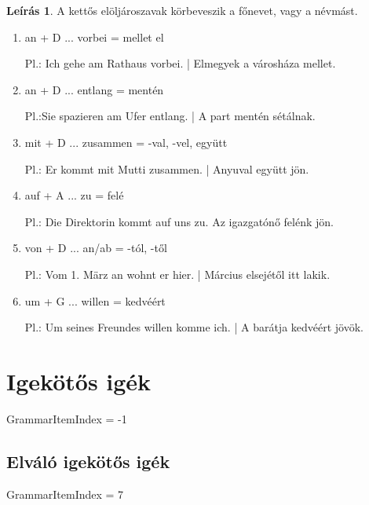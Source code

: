 \documentclass{article}
\theoremstyle{definition}
\newtheorem*{desc}{Leírás}
\begin{document}
\begin{desc}
A kettős elöljároszavak körbeveszik a főnevet, vagy a névmást.

\begin{enumerate}
\item an + D ... vorbei = mellet el

Pl.: Ich gehe am Rathaus vorbei. | Elmegyek a városháza mellet.

\item an + D ... entlang = mentén

Pl.:Sie spazieren am Ufer entlang. | A part mentén sétálnak.

\item mit + D ... zusammen = -val, -vel, együtt

Pl.: Er kommt mit Mutti zusammen. | Anyuval együtt jön.

\item auf + A ... zu = felé

Pl.: Die Direktorin kommt auf uns zu. Az igazgatónő felénk jön.

\item von + D ... an/ab = -tól, -től

Pl.: Vom 1. März an wohnt er hier. | Március elsejétől itt lakik.

\item um + G ... willen = kedvéért

Pl.: Um seines Freundes willen komme ich. | A barátja kedvéért jövök. 
\end{enumerate}
\end{desc}

\section{Igekötős igék}

GrammarItemIndex = -1

\subsection{Elváló igekötős igék}

GrammarItemIndex = 7
\end{document}
